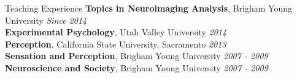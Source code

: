 \documentclass{resume} %
\begin{document}
\begin{rSection}{Teaching Experience}
	{\bf Topics in Neuroimaging Analysis}, Brigham Young University \hfill {\em Since 2014}
	\\{\bf Experimental Psychology}, Utah Valley University \hfill {\em 2014}
	\\{\bf Perception}, California State University, Sacramento \hfill {\em 2013}
	\\{\bf Sensation and Perception}, Brigham Young University \hfill {\em 2007 - 2009}
	\\{\bf Neuroscience and Society}, Brigham Young University \hfill {\em 2007 - 2009}
\end{rSection}

\end{document}
